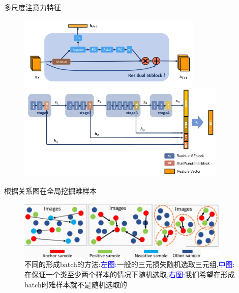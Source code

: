 \documentclass[notes]{beamer}
\begin{document}
\begin{frame}
	{多尺度注意力特征}
	\begin{figure}
		\centering
		\includegraphics[width=0.78\textwidth]{2018-03-12-11-10-16.png} \\ 
		\includegraphics[width=0.89\textwidth]{2018-03-12-11-10-04.png} 
	\end{figure}
\end{frame}

\begin{frame}
	{根据关系图在全局挖掘难样本} 
	\begin{figure}
		\centering 
		\includegraphics[width=0.9\textwidth]{2018-03-12-11-21-00.png}	
		\caption{不同的形成batch的方法:\textcolor{blue}{左图:}一般的三元损失随机选取三元组,\textcolor{blue}{中图:}\cite{hermans2017defense}在保证一个类至少两个样本的情况下随机选取,\textcolor{blue}{右图:}我们希望在形成batch时难样本就不是随机选取的}
	\end{figure}
\end{frame}
\end{document}
